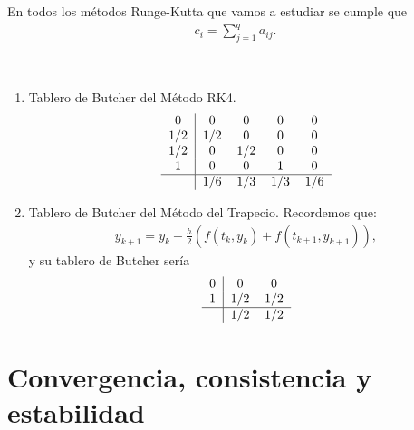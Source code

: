 \begin{obs}
    En todos los métodos Runge-Kutta que vamos a estudiar se cumple que
    \begin{align*}
        c_i = \sum_{j=1}^{q} a_{ij}.
    \end{align*}
\end{obs}

\begin{ejemplo} \
    \begin{enumerate}
        \item Tablero de Butcher del Método RK4.
              \begin{align*}
                  \begin{tabular}{c|cccc}
                      0   & 0   & 0   & 0   & 0   \\
                      1/2 & 1/2 & 0   & 0   & 0   \\
                      1/2 & 0   & 1/2 & 0   & 0   \\
                      1   & 0   & 0   & 1   & 0   \\ \hline
                          & 1/6 & 1/3 & 1/3 & 1/6
                  \end{tabular}
              \end{align*}
        \item Tablero de Butcher del Método del Trapecio. Recordemos que:
              \begin{align*}
                  y_{k+1} = y_k + \frac{h}{2}(f(t_k,y_k) + f(t_{k+1},y_{k+1})),
              \end{align*}
              y su tablero de Butcher sería
              \begin{align*}
                  \begin{tabular}{c|cc}
                      0 & 0   & 0   \\
                      1 & 1/2 & 1/2 \\ \hline
                        & 1/2 & 1/2
                  \end{tabular}
              \end{align*}
    \end{enumerate}
\end{ejemplo}

\section{Convergencia, consistencia y estabilidad}

